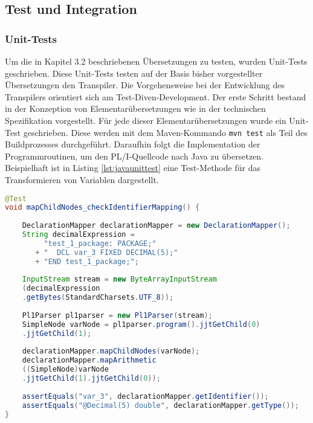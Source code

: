 \pagebreak
\subsection{Test und Integration}
\subsubsection{Unit-Tests}

Um die in Kapitel 3.2 beschriebenen Übersetzungen zu testen, wurden Unit-Tests geschrieben. 
Diese Unit-Tests testen auf der Basis bisher vorgestellter Übersetzungen den Transpiler. Die Vorgehensweise bei der Entwicklung des Transpilers orientiert sich am Test-Diven-Development. 
Der erste Schritt bestand in der Konzeption von Elementarübersetzungen wie in der technischen Spezifikation vorgestellt.
Für jede dieser Elementarübersetzungen wurde ein Unit-Test geschrieben. Diese werden mit dem Maven-Kommando \verb+mvn test+ als Teil des Buildprozesses durchgeführt. Daraufhin folgt die Implementation der Programmroutinen, um den PL/I-Quellcode nach Java zu übersetzen.
Beispielhaft ist in Listing \ref{lst:javaunittest} eine Test-Methode für das Transformieren von Variablen dargestellt.

\begin{lstlisting}[language=Java, caption=Positvtest für die Übersetzung eines arithmetischen Ausdrucks, label={lst:javaunittest}]
@Test
void mapChildNodes_checkIdentifierMapping() {
	
	DeclarationMapper declarationMapper = new DeclarationMapper();
	String decimalExpression = 
		 "test_1_package: PACKAGE;" 
	   + "	DCL var_3 FIXED DECIMAL(5);" 
	   + "END test_1_package;";
	
	InputStream stream = new ByteArrayInputStream
	(decimalExpression
	.getBytes(StandardCharsets.UTF_8));
	
	Pl1Parser pl1parser = new Pl1Parser(stream);
	SimpleNode varNode = pl1parser.program().jjtGetChild(0)
	.jjtGetChild(1);
		
	declarationMapper.mapChildNodes(varNode);
	declarationMapper.mapArithmetic
	((SimpleNode)varNode
	.jjtGetChild(1).jjtGetChild(0));
		
	assertEquals("var_3", declarationMapper.getIdentifier());
	assertEquals("@Decimal(5) double", declarationMapper.getType());
}
\end{lstlisting} 

